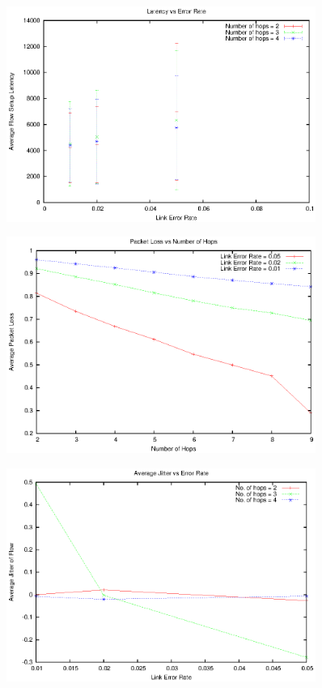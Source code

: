 \documentclass[a4]{article}
\begin{document}
\begin{figure}
\centering
\includegraphics[width=0.9\textwidth]{latency-vs-error.eps}
\end{figure}
\begin{figure}
\centering
\includegraphics[width=0.9\textwidth]{loss-vs-hops.eps}
\end{figure}
\begin{figure}
\centering
\includegraphics[width=0.9\textwidth]{jitter-vs-error.eps}
\end{figure}
\end{document}
